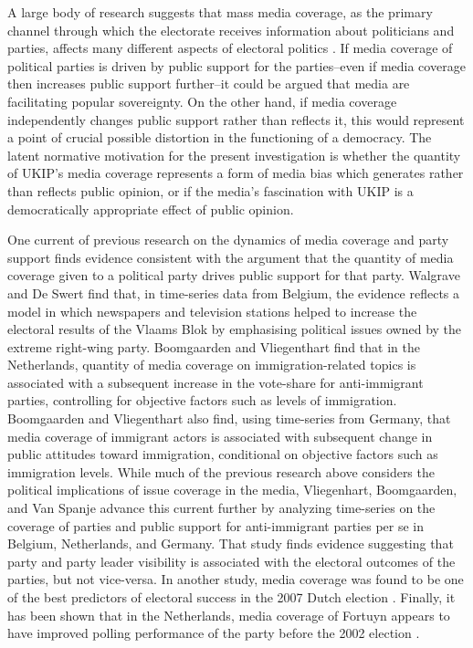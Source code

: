 \documentclass[12pt,]{article}
\begin{document}
A large body of research suggests that mass media coverage, as the
primary channel through which the electorate receives information about
politicians and parties, affects many different aspects of electoral
politics
\citep{norris_virtuous_2000, paletz_political_1996, beck_social_2002, dalton_partisan_1998}.
If media coverage of political parties is driven by public support for
the parties--even if media coverage then increases public support
further--it could be argued that media are facilitating popular
sovereignty. On the other hand, if media coverage independently changes
public support rather than reflects it, this would represent a point of
crucial possible distortion in the functioning of a democracy. The
latent normative motivation for the present investigation is whether the
quantity of UKIP's media coverage represents a form of media bias which
generates rather than reflects public opinion, or if the media's
fascination with UKIP is a democratically appropriate effect of public
opinion.

One current of previous research on the dynamics of media coverage and
party support finds evidence consistent with the argument that the
quantity of media coverage given to a political party drives public
support for that party. Walgrave and De Swert
\citeyearpar{walgrave_making_2004} find that, in time-series data from
Belgium, the evidence reflects a model in which newspapers and
television stations helped to increase the electoral results of the
Vlaams Blok by emphasising political issues owned by the extreme
right-wing party. Boomgaarden and Vliegenthart
\citetext{\citeyear{Boomgaarden:2007ia}; \citealp{vliegenthart_why_2010}}
find that in the Netherlands, quantity of media coverage on
immigration-related topics is associated with a subsequent increase in
the vote-share for anti-immigrant parties, controlling for objective
factors such as levels of immigration. Boomgaarden and Vliegenthart
\citeyearpar{Boomgaarden:2009ke} also find, using time-series from
Germany, that media coverage of immigrant actors is associated with
subsequent change in public attitudes toward immigration, conditional on
objective factors such as immigration levels. While much of the previous
research above considers the political implications of issue coverage in
the media, Vliegenhart, Boomgaarden, and Van Spanje
\citeyearpar{vliegenthart_anti-immigrant_2012} advance this current
further by analyzing time-series on the coverage of parties and public
support for anti-immigrant parties per se in Belgium, Netherlands, and
Germany. That study finds evidence suggesting that party and party
leader visibility is associated with the electoral outcomes of the
parties, but not vice-versa. In another study, media coverage was found
to be one of the best predictors of electoral success in the 2007 Dutch
election \citep{hopmann_effects_2010}. Finally, it has been shown that
in the Netherlands, media coverage of Fortuyn appears to have improved
polling performance of the party before the 2002 election
\citep{koopmans_rise_2009}.
\end{document}
